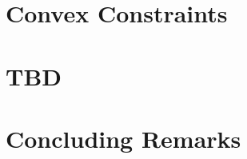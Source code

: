 \documentclass[11pt,letterpaper]{thesis2}
\begin{document}
\chapter{Convex Constraints}\label{chap:convex}

\chapter{TBD}\label{chap:tbd}

\chapter{Concluding Remarks}\label{chap:conclusion}


 \begin{appendix}
% 
 \end{appendix}





% 

% 
\end{document}
